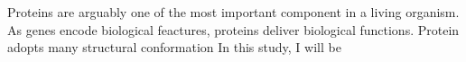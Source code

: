 Proteins are arguably one of the most important component in a living organism. As genes encode biological feactures, proteins deliver biological functions. Protein adopts many structural conformation   In this study, I will be 